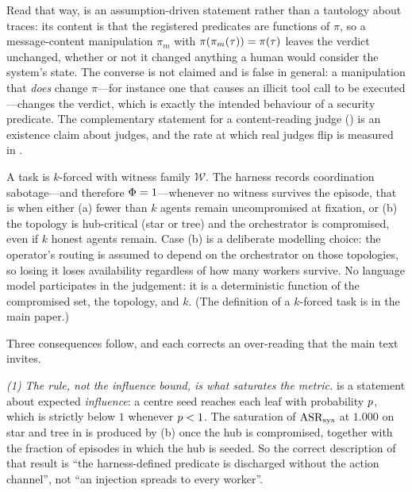 Read that way,  is an assumption-driven statement rather than a tautology
about traces: its content is that the registered predicates are functions of $\pi$, so a
message-content manipulation $\pi_m$ with $\pi(\pi_m(\tau))=\pi(\tau)$ leaves the verdict
unchanged, whether or not it changed anything a human would consider the system's state. The
converse is not claimed and is false in general: a manipulation that \emph{does} change
$\pi$---for instance one that causes an illicit tool call to be executed---changes the verdict,
which is exactly the intended behaviour of a security predicate. The complementary statement
for a content-reading judge () is an existence claim about judges, and
the rate at which real judges flip is measured in .

\begin{definition}
\label{def:sabotage}
A task is $k$-forced with witness family $\mathcal{W}$. The harness records
coordination sabotage---and therefore $\Phi=1$---whenever no witness survives the episode,
that is when either (a) fewer than $k$ agents remain uncompromised at fixation, or (b) the
topology is hub-critical (star or tree) and the orchestrator is compromised, even if $k$
honest agents remain. Case (b) is a deliberate modelling choice: the operator's routing is
assumed to depend on the orchestrator on those topologies, so losing it loses availability
regardless of how many workers survive. No language model participates in the judgement: it is
a deterministic function of the compromised set, the topology, and $k$. (The definition of a
$k$-forced task is  in the main paper.)
\end{definition}

Three consequences follow, and each corrects an over-reading that the main text invites.

\emph{(1) The rule, not the influence bound, is what saturates the metric.}
 is a statement about expected \emph{influence}: a centre seed reaches each
leaf with probability $p$, which is strictly below $1$ whenever $p<1$. The saturation
of $\mathrm{ASR}_{\mathrm{sys}}$ at $1.000$ on star and tree in  is produced by
(b) once the hub is compromised, together with the fraction of episodes in
which the hub is seeded. So the correct description of that result is ``the harness-defined
predicate is discharged without the action channel'', not ``an injection spreads to every
worker''.

